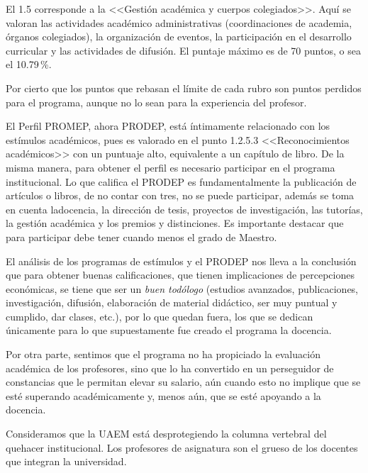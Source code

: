 El 1.5 corresponde a la <<Gestión académica y cuerpos colegiados>>. Aquí se valoran las
actividades académico administrativas (coordinaciones de academia, órganos
colegiados), la organización de eventos,  la participación en el desarrollo
curricular  y las actividades de difusión. El puntaje máximo es de 70
puntos, o sea el 10.79\,\%.


Por cierto que los puntos que rebasan el límite de cada rubro son puntos
perdidos para el programa, aunque no lo sean para la experiencia del
profesor. 


El Perfil PROMEP, ahora PRODEP, está íntimamente relacionado con los
estímulos académicos, pues es valorado en el punto 1.2.5.3
<<Reconocimientos académicos>> con un puntuaje alto, equivalente a un capítulo
de libro. De la misma manera, para obtener el perfil es necesario participar en el
programa institucional. Lo que califica el PRODEP es fundamentalmente la
publicación de artículos o libros, de no contar con tres, no se puede
participar, además se toma en cuenta la\linebreak docencia, la dirección de tesis,
proyectos de investigación, las tutorías, la gestión académica y los
premios y distinciones. Es importante destacar que para participar debe
tener cuando menos el grado de Maestro.


El análisis de los programas de estímulos y el PRODEP nos lleva a la
conclusión que para obtener buenas calificaciones, que tienen implicaciones
 de percepciones económicas, se tiene que ser un \textit{buen todólogo}
(estudios avanzados, publicaciones, investigación, difusión, elaboración de
material didáctico, ser muy puntual y cumplido, dar clases, etc.), por lo
que quedan fuera, los que se dedican únicamente para lo que supuestamente
fue creado el programa la docencia.


Por otra parte, sentimos que el programa no ha propiciado la evaluación
académica de los profesores, sino que lo ha convertido en un perseguidor de
constancias que le permitan elevar su salario, aún cuando esto no implique
que se esté superando académicamente y, menos aún, que se esté apoyando a la
docencia.


Consideramos que la UAEM está desprotegiendo la columna vertebral del
quehacer institucional. Los profesores de asignatura son el grueso de los
docentes que integran la universidad. 


